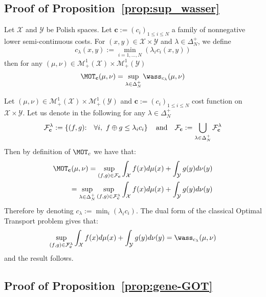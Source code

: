 \subsection{Proof of Proposition~\ref{prop:sup_wasser}}
\begin{prop*}
Let $\mathcal{X}$ and $\mathcal{Y}$ be Polish spaces. Let $\mathbf{c}:=(c_i)_{1\leq i\leq N}$ a family of nonnegative lower semi-continuous costs. For $(x,y)\in \mathcal{X}\times \mathcal{Y}$ and $\lambda\in\Delta_N^{+}$, we define 
$$c_\lambda(x,y):=\min_{i=1,...,N}(\lambda_i c_i(x,y))$$
then for any $(\mu,\nu)\in\mathcal{M}_+^{1}(\mathcal{X})\times\mathcal{M}_+^{1}(\mathcal{Y})$  
\begin{align}
    \MOT_{\mathbf{c}}(\mu,\nu)=\sup_{\lambda\in\Delta_N^{+}} \wass_{c_\lambda}(\mu,\nu)
\end{align}
\end{prop*}

\begin{prv*}
Let $(\mu,\nu)\in\mathcal{M}_+^{1}(\mathcal{X})\times\mathcal{M}_+^{1}(\mathcal{Y})$ and $\mathbf{c}:=(c_i)_{1\leq i\leq N}$ cost function on $\mathcal{X}\times \mathcal{Y}$. Let us denote in the following for any $\lambda\in\Delta_N^{+}$ 
\begin{align*}
\mathcal{F}_{\mathbf{c}}^{\lambda}:=\left\{(f,g)\text{:\quad} \forall i,~f \oplus g\leq \lambda_ic_i\right\}\quad\text{and}\quad \mathcal{F}_{\mathbf{c}}:=\bigcup_{\lambda\in\Delta_N^{+}} \mathcal{F}_{\mathbf{c}}^{\lambda}
\end{align*}
Then by definition of $\MOT_{c}$ we have that:
\begin{align*}
    \MOT_{\mathbf{c}}(\mu,\nu)= \sup_{(f,g)\in \mathcal{F}_{\mathbf{c}}} \int_{\mathcal{X}} f(x)d\mu(x)+ \int_{\mathcal{Y}} g(y)d\nu(y)\\
    = \sup_{\lambda\in\Delta_N^{+}} \sup_{(f,g)\in \mathcal{F}_{\mathbf{c}}^{\lambda}} \int_{\mathcal{X}} f(x)d\mu(x)+ \int_{\mathcal{Y}} g(y)d\nu(y)
\end{align*}
Therefore by denoting $c_\lambda:=\min_i(\lambda_ic_i)$. The dual form of the classical Optimal Transport problem gives that:
\begin{align*}
\sup_{(f,g)\in \mathcal{F}_{\mathbf{c}}^{\lambda}} \int_{\mathcal{X}} f(x)d\mu(x)+ \int_{\mathcal{Y}} g(y)d\nu(y) =  \wass_{c_\lambda}(\mu,\nu)
\end{align*}
and the result follows.
\end{prv*}

\subsection{Proof of Proposition~\ref{prop:gene-GOT}}

